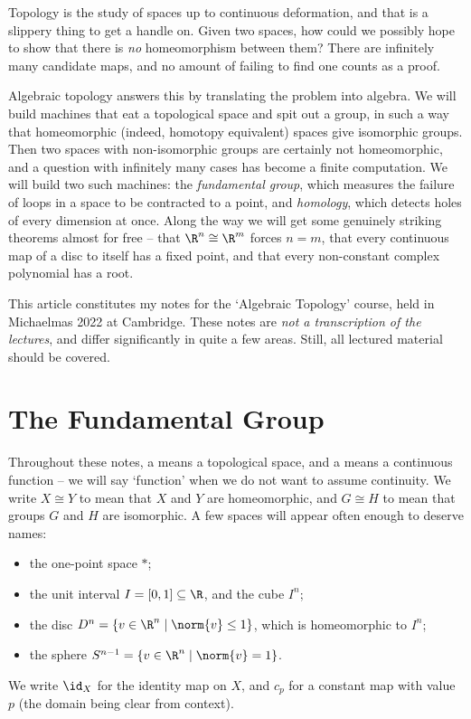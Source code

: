 



Topology is the study of spaces up to continuous deformation, and that is a slippery
thing to get a handle on. Given two spaces, how could we possibly hope to show that
there is \emph{no} homeomorphism between them? There are infinitely many candidate maps,
and no amount of failing to find one counts as a proof.

Algebraic topology answers this by translating the problem into algebra. We will build
machines that eat a topological space and spit out a group, in such a way that
homeomorphic (indeed, homotopy equivalent) spaces give isomorphic groups. Then two
spaces with non-isomorphic groups are certainly not homeomorphic, and a question with
infinitely many cases has become a finite computation. We will build two such machines:
the \emph{fundamental group}, which measures the failure of loops in a space to be
contracted to a point, and \emph{homology}, which detects holes of every dimension at
once. Along the way we will get some genuinely striking theorems almost for free --
that $\R^n \cong \R^m$ forces $n = m$, that every continuous map of a disc to itself has
a fixed point, and that every non-constant complex polynomial has a root.

This article constitutes my notes for the `Algebraic Topology' course, held in Michaelmas
2022 at Cambridge. These notes are \emph{not a transcription of the lectures}, and differ
significantly in quite a few areas. Still, all lectured material should be covered.



\section{The Fundamental Group}

Throughout these notes, a  means a topological space, and a 
means a continuous function -- we will say `function' when we do not want to assume
continuity. We write $X \cong Y$ to mean that $X$ and $Y$ are homeomorphic, and $G \cong H$
to mean that groups $G$ and $H$ are isomorphic. A few spaces will appear often enough to
deserve names:
\begin{itemize}
	\item the one-point space $*$;
	\item the unit interval $I = [0,1] \subseteq \R$, and the cube $I^n$;
	\item the disc $D^n = \{ v \in \R^n \mid \norm{v} \leq 1\}$, which is homeomorphic to $I^n$;
	\item the sphere $S^{n-1} = \{v \in \R^n \mid \norm{v} = 1\}$.
\end{itemize}
We write $\id_X$ for the identity map on $X$, and $c_p$ for a constant map with value $p$
(the domain being clear from context).

